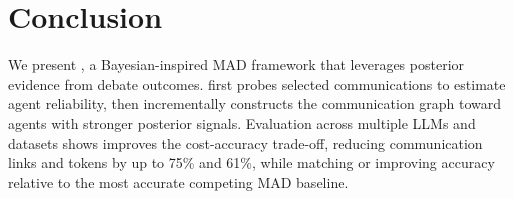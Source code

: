 \section{Conclusion}

We present \sysname, a Bayesian-inspired MAD framework that leverages posterior evidence from debate outcomes. \sysname first probes selected communications to estimate agent reliability, then incrementally constructs the communication graph toward agents with stronger posterior signals. Evaluation across multiple LLMs and datasets shows \sysname improves the cost-accuracy trade-off, reducing communication links and tokens by up to 75\% and 61\%, while matching or improving accuracy relative to the most accurate competing MAD baseline.
